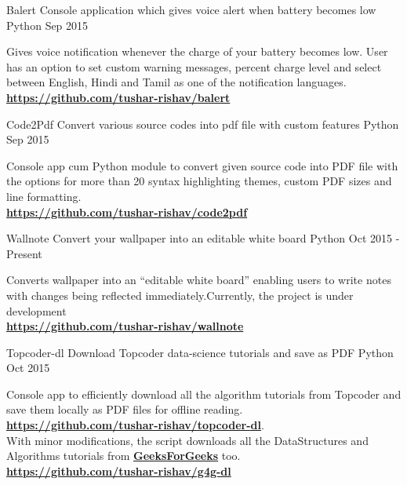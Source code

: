 \begin{cventries}
  \cventry
    {Balert}
    {Console application which gives voice alert when battery becomes low}
    {Python}
    {Sep 2015}
    {
      \begin{cvitems}
        \item {Gives voice notification whenever the charge of your battery becomes low. User has an option to set custom warning messages, percent charge level and select between English, Hindi and Tamil as one of the notification languages.\\ \textbf{\href{https://github.com/tushar-rishav/balert}{https://github.com/tushar-rishav/balert}}
        }
      \end{cvitems}
    }
  \cventry
    {Code2Pdf}
    {Convert various source codes into pdf file with custom features}
    {Python}
    {Sep 2015}
    {
      \begin{cvitems}
        \item {Console app cum Python module to convert given source code into PDF file with the options for more than 20 syntax highlighting themes, custom PDF sizes and line formatting.\\ \textbf{\href{https://github.com/tushar-rishav/code2pdf}{https://github.com/tushar-rishav/code2pdf}}
        }
      \end{cvitems}
    }
  \cventry
    {Wallnote}
    {Convert your wallpaper into an editable white board}
    {Python}
    {Oct 2015 - Present}
    {
      \begin{cvitems}
        \item {Converts wallpaper into an “editable white board” enabling users to write notes with changes being reflected immediately.Currently, the project is
under development\\ \textbf{\href{https://github.com/tushar-rishav/wallnote}{https://github.com/tushar-rishav/wallnote}}
        }
      \end{cvitems}
    }
  \cventry
    {Topcoder-dl}
    {Download Topcoder data-science tutorials and save as PDF}
    {Python}
    {Oct 2015}
    {
      \begin{cvitems}
        \item {Console app to efficiently download all the algorithm tutorials from Topcoder and save them locally as PDF files for offline reading.\\ \textbf{\href{https://github.com/tushar-rishav/topcoder-dl}{https://github.com/tushar-rishav/topcoder-dl}}.\\ With minor modifications, the script downloads all the DataStructures and Algorithms tutorials from \textbf{\href{http://www.geeksforgeeks.org/}{GeeksForGeeks}} too. \\ \textbf{\href{https://github.com/tushar-rishav/g4g-dl}{https://github.com/tushar-rishav/g4g-dl}}
}
\end{cvitems}}
\end{cventries}
